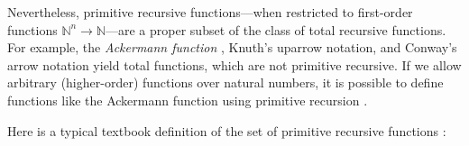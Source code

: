 \documentclass{jfp}
\begin{document}
Nevertheless,  primitive recursive functions---when restricted to
first-order functions $\mathbb{N}^n \to \mathbb{N}$---are a proper subset of 
the class of total recursive functions. For example, the
\emph{Ackermann function} \cite{szasz1991machine}, Knuth's uparrow
notation, and Conway's arrow notation yield total functions, which are
not primitive recursive.
If we allow arbitrary (higher-order)
functions over natural numbers, it is possible to define functions
like the Ackermann function using primitive recursion
\cite{DBLP:journals/corr/Widemann16}. 


 




Here is a typical textbook definition of the set of primitive
recursive functions \cite{martin2019logik,wiki:Primitive_recursive_function}:
\end{document}

